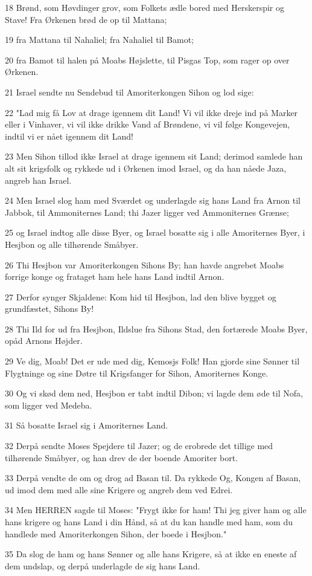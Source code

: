 \par 18 Brønd, som Høvdinger grov, som Folkets ædle bored med Herskerspir og Stave! Fra Ørkenen brød de op til Mattana;
\par 19 fra Mattana til Nahaliel; fra Nahaliel til Bamot;
\par 20 fra Bamot til halen på Moabs Højslette, til Pisgas Top, som rager op over Ørkenen.
\par 21 Israel sendte nu Sendebud til Amoriterkongen Sihon og lod sige:
\par 22 "Lad mig få Lov at drage igennem dit Land! Vi vil ikke dreje ind på Marker eller i Vinhaver, vi vil ikke drikke Vand af Brøndene, vi vil følge Kongevejen, indtil vi er nået igennem dit Land!
\par 23 Men Sihon tillod ikke Israel at drage igennem sit Land; derimod samlede han alt sit krigsfolk og rykkede ud i Ørkenen imod Israel, og da han nåede Jaza, angreb han Israel.
\par 24 Men Israel slog ham med Sværdet og underlagde sig hans Land fra Arnon til Jabbok, til Ammoniternes Land; thi Jazer ligger ved Ammoniternes Grænse;
\par 25 og Israel indtog alle disse Byer, og Israel bosatte sig i alle Amoriternes Byer, i Hesjbon og alle tilhørende Småbyer.
\par 26 Thi Hesjbon var Amoriterkongen Sihons By; han havde angrebet Moabs forrige konge og frataget ham hele hans Land indtil Arnon.
\par 27 Derfor synger Skjaldene: Kom hid til Hesjbon, lad den blive bygget og grundfæstet, Sihons By!
\par 28 Thi Ild for ud fra Hesjbon, Ildslue fra Sihons Stad, den fortærede Moabs Byer, opåd Arnons Højder.
\par 29 Ve dig, Moab! Det er ude med dig, Kemosjs Folk! Han gjorde sine Sønner til Flygtninge og sine Døtre til Krigsfanger for Sihon, Amoriternes Konge.
\par 30 Og vi skød dem ned, Hesjbon er tabt indtil Dibon; vi lagde dem øde til Nofa, som ligger ved Medeba.
\par 31 Så bosatte Israel sig i Amoriternes Land.
\par 32 Derpå sendte Moses Spejdere til Jazer; og de erobrede det tillige med tilhørende Småbyer, og han drev de der boende Amoriter bort.
\par 33 Derpå vendte de om og drog ad Basan til. Da rykkede Og, Kongen af Basan, ud imod dem med alle sine Krigere og angreb dem ved Edrei.
\par 34 Men HERREN sagde til Moses: "Frygt ikke for ham! Thi jeg giver ham og alle hans krigere og hans Land i din Hånd, så at du kan handle med ham, som du handlede med Amoriterkongen Sihon, der boede i Hesjbon."
\par 35 Da slog de ham og hans Sønner og alle hans Krigere, så at ikke en eneste af dem undslap, og derpå underlagde de sig hans Land.


